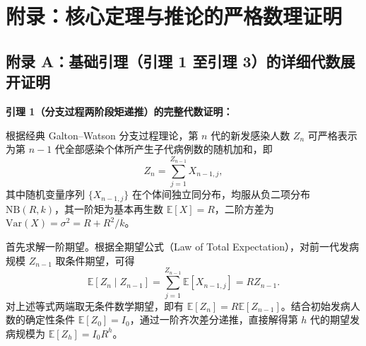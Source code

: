 \documentclass[11pt,a4paper]{article}
\theoremstyle{plain}
\theoremstyle{definition}
\begin{document}
\clearpage
\appendix
\section*{附录：核心定理与推论的严格数理证明}

\subsection*{附录 A：基础引理（引理 1 至引理 3）的详细代数展开证明}

\noindent\textbf{引理 1（分支过程两阶段矩递推）的完整代数证明：}

根据经典 Galton--Watson 分支过程理论\citep{athreya1972branching}，第 $n$ 代的新发感染人数 $Z_n$ 可严格表示为第 $n-1$ 代全部感染个体所产生子代病例数的随机加和，即
\begin{equation}
Z_n = \sum_{j=1}^{Z_{n-1}} X_{n-1, j},
\end{equation}
其中随机变量序列 $\{X_{n-1, j}\}$ 在个体间独立同分布，均服从负二项分布 $\text{NB}(R, k)$，其一阶矩为基本再生数 $\mathbb{E}[X] = R$，二阶方差为 $\text{Var}(X) = \sigma^2 = R + R^2/k$。

首先求解一阶期望。根据全期望公式（Law of Total Expectation），对前一代发病规模 $Z_{n-1}$ 取条件期望，可得
\begin{equation}
\mathbb{E}[Z_n \mid Z_{n-1}] = \sum_{j=1}^{Z_{n-1}} \mathbb{E}[X_{n-1, j}] = R Z_{n-1}.
\end{equation}
对上述等式两端取无条件数学期望，即有 $\mathbb{E}[Z_n] = R \mathbb{E}[Z_{n-1}]$。结合初始发病人数的确定性条件 $\mathbb{E}[Z_0] = I_0$，通过一阶齐次差分递推，直接解得第 $h$ 代的期望发病规模为 $\mathbb{E}[Z_h] = I_0 R^h$。
\end{document}
